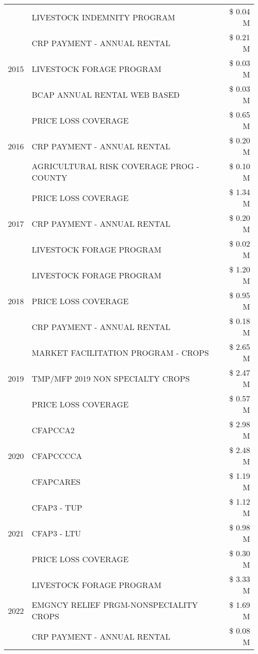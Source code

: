 \begin{tabular}{llr}
 & LIVESTOCK INDEMNITY PROGRAM & \$ 0.04 M \\
\cline{1-3}
\multirow[t]{3}{*}{2015} & CRP PAYMENT - ANNUAL RENTAL & \$ 0.21 M \\
 & LIVESTOCK FORAGE PROGRAM & \$ 0.03 M \\
 & BCAP ANNUAL RENTAL WEB BASED & \$ 0.03 M \\
\cline{1-3}
\multirow[t]{3}{*}{2016} & PRICE LOSS COVERAGE & \$ 0.65 M \\
 & CRP PAYMENT - ANNUAL RENTAL & \$ 0.20 M \\
 & AGRICULTURAL RISK COVERAGE PROG - COUNTY & \$ 0.10 M \\
\cline{1-3}
\multirow[t]{3}{*}{2017} & PRICE LOSS COVERAGE & \$ 1.34 M \\
 & CRP PAYMENT - ANNUAL RENTAL & \$ 0.20 M \\
 & LIVESTOCK FORAGE PROGRAM & \$ 0.02 M \\
\cline{1-3}
\multirow[t]{3}{*}{2018} & LIVESTOCK FORAGE PROGRAM & \$ 1.20 M \\
 & PRICE LOSS COVERAGE & \$ 0.95 M \\
 & CRP PAYMENT - ANNUAL RENTAL & \$ 0.18 M \\
\cline{1-3}
\multirow[t]{3}{*}{2019} & MARKET FACILITATION PROGRAM - CROPS & \$ 2.65 M \\
 & TMP/MFP 2019 NON SPECIALTY CROPS & \$ 2.47 M \\
 & PRICE LOSS COVERAGE & \$ 0.57 M \\
\cline{1-3}
\multirow[t]{3}{*}{2020} & CFAPCCA2 & \$ 2.98 M \\
 & CFAPCCCCA & \$ 2.48 M \\
 & CFAPCARES & \$ 1.19 M \\
\cline{1-3}
\multirow[t]{3}{*}{2021} & CFAP3 - TUP & \$ 1.12 M \\
 & CFAP3 - LTU & \$ 0.98 M \\
 & PRICE LOSS COVERAGE & \$ 0.30 M \\
\cline{1-3}
\multirow[t]{3}{*}{2022} & LIVESTOCK FORAGE PROGRAM & \$ 3.33 M \\
 & EMGNCY RELIEF PRGM-NONSPECIALITY CROPS & \$ 1.69 M \\
 & CRP PAYMENT - ANNUAL RENTAL & \$ 0.08 M \\
\cline{1-3}
\bottomrule
\end{tabular}
